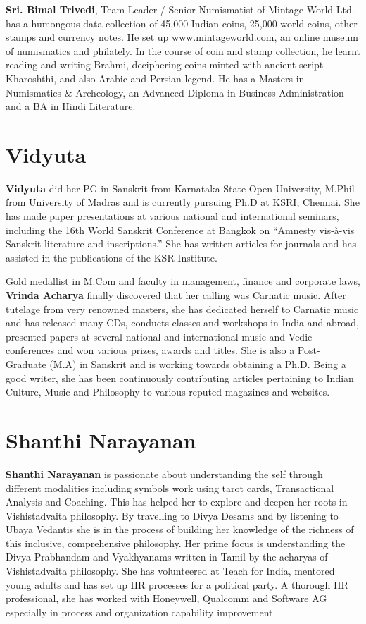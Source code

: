\vskip -2pt

\textbf{Sri. Bimal Trivedi}, Team Leader / Senior Numismatist of Mintage World Ltd. has a humongous data collection of 45,000 Indian coins, 25,000 world coins, other stamps and currency notes. He set up www.mintageworld.com, an online museum of numismatics and philately. In the course of coin and stamp collection, he learnt reading and writing Brahmi, deciphering coins minted with ancient script Kharoshthi, and also Arabic and Persian legend. He has a Masters in Numismatics \& Archeology, an Advanced Diploma in Business Administration and a BA in Hindi Literature.

\section*{Vidyuta}

\vskip -2pt

\textbf{Vidyuta} did her PG in Sanskrit from Karnataka State Open University, M.Phil from University of Madras and is currently pursuing Ph.D at KSRI, Chennai. She has made paper presentations at various national and international seminars, including the 16th World Sanskrit Conference at Bangkok on “Amnesty vis-à-vis Sanskrit literature and inscriptions.” She has written articles for journals and has assisted in the publications of the KSR Institute.

Gold medallist in M.Com and faculty in management, finance and corporate laws, \textbf{Vrinda Acharya} finally discovered that her calling was Carnatic music. After tutelage from very renowned masters, she has dedicated herself to Carnatic music and has released many CDs, conducts classes and workshops in India and abroad, presented papers at several national and international music and Vedic conferences and won various prizes, awards and titles. She is also a Post- Graduate (M.A) in Sanskrit and is working towards obtaining a Ph.D. Being a good writer, she has been continuously contributing articles pertaining to Indian Culture, Music and Philosophy to various reputed magazines and websites. 

\section*{Shanthi Narayanan}

\textbf{Shanthi Narayanan} is passionate about understanding the self through different modalities including symbols work using tarot cards, Transactional Analysis and Coaching. This has helped her to explore and deepen her roots in Vishistadvaita philosophy. By travelling to Divya Desams and by listening to Ubaya Vedantis she is in the process of building her knowledge of the richness of this inclusive, comprehensive philosophy. Her prime focus is understanding the Divya Prabhandam and Vyakhyanams written in Tamil by the acharyas of Vishistadvaita philosophy. She has volunteered at Teach for India, mentored young adults and has set up HR processes for a political party. A thorough HR professional, she has worked with Honeywell, Qualcomm and Software AG especially in process and organization capability improvement.

